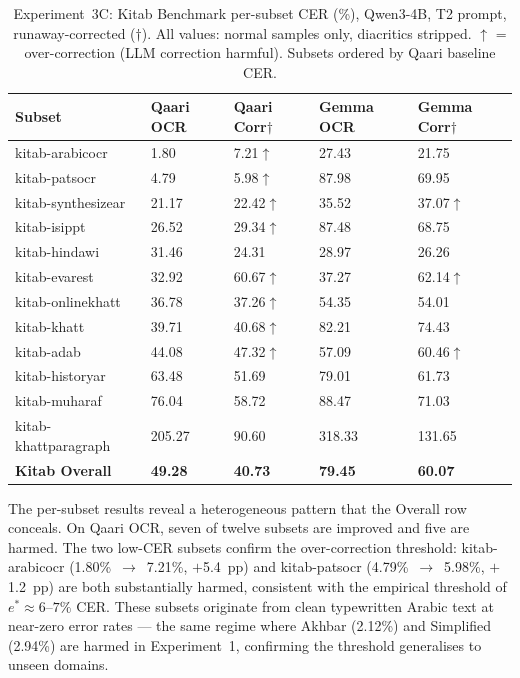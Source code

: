 \begin{table}[htbp]
  \centering
  \caption{Experiment~3C: Kitab Benchmark per-subset CER (\%), Qwen3-4B,
           T2 prompt, runaway-corrected ($\dagger$). All values: normal
           samples only, diacritics stripped. $\uparrow$ = over-correction
           (LLM correction harmful). Subsets ordered by Qaari baseline CER.}
  \label{tab:exp3_kitab}
  \begin{tabularx}{\textwidth}{lXXXX}
    \toprule
    \textbf{Subset} & \textbf{Qaari OCR} & \textbf{Qaari Corr$\dagger$}
      & \textbf{Gemma OCR} & \textbf{Gemma Corr$\dagger$} \\
    \midrule
    kitab-arabicocr       &  1.80 &  7.21$\uparrow$ & 27.43 & 21.75 \\
    kitab-patsocr         &  4.79 &  5.98$\uparrow$ & 87.98 & 69.95 \\
    kitab-synthesizear    & 21.17 & 22.42$\uparrow$ & 35.52 & 37.07$\uparrow$ \\
    kitab-isippt          & 26.52 & 29.34$\uparrow$ & 87.48 & 68.75 \\
    kitab-hindawi         & 31.46 & 24.31 & 28.97 & 26.26 \\
    kitab-evarest         & 32.92 & 60.67$\uparrow$ & 37.27 & 62.14$\uparrow$ \\
    kitab-onlinekhatt     & 36.78 & 37.26$\uparrow$ & 54.35 & 54.01 \\
    kitab-khatt           & 39.71 & 40.68$\uparrow$ & 82.21 & 74.43 \\
    kitab-adab            & 44.08 & 47.32$\uparrow$ & 57.09 & 60.46$\uparrow$ \\
    kitab-historyar       & 63.48 & 51.69 & 79.01 & 61.73 \\
    kitab-muharaf         & 76.04 & 58.72 & 88.47 & 71.03 \\
    kitab-khattparagraph  &205.27 & 90.60 &318.33 &131.65 \\
    \midrule
    \textbf{Kitab Overall} & \textbf{49.28} & \textbf{40.73} & \textbf{79.45} & \textbf{60.07} \\
    \bottomrule
  \end{tabularx}
\end{table}

The per-subset results reveal a heterogeneous pattern that the Overall row
conceals. On Qaari OCR, seven of twelve subsets are improved and five are
harmed. The two low-CER subsets confirm the over-correction threshold:
kitab-arabicocr (1.80\%~$\to$~7.21\%, $+$5.4~pp) and kitab-patsocr
(4.79\%~$\to$~5.98\%, $+$1.2~pp) are both substantially harmed, consistent
with the empirical threshold of $e^* \approx 6$--$7\%$ CER. These subsets
originate from clean typewritten Arabic text at near-zero error rates ---
the same regime where Akhbar (2.12\%) and Simplified (2.94\%) are harmed in
Experiment~1, confirming the threshold generalises to unseen domains.

